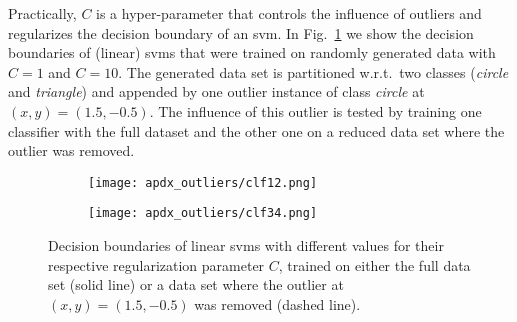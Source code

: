 Practically, $C$ is a hyper-parameter that controls the influence of outliers and regularizes the decision boundary of an \gls{svm}.
In Fig.~\ref{fig:apdx_svm} we show the decision boundaries of (linear) \glspl{svm} that were trained on randomly generated data with $C=1$ and $C=10$.
The generated data set is partitioned w.r.t.\ two classes (\textit{circle} and \textit{triangle}) and appended by one outlier instance of class \textit{circle} at $(x,y)=(1.5,-0.5)$.
The influence of this outlier is tested by training one classifier with the full dataset and the other one on a reduced data set where the outlier was removed.
\begin{figure}[htbp]
    \centering
    \begin{subfigure}{.49\textwidth}
        \centering
        \texttt{[image: apdx\_outliers/clf12.png]}
    \end{subfigure}
    \begin{subfigure}{.49\textwidth}
        \centering
        \texttt{[image: apdx\_outliers/clf34.png]}
    \end{subfigure}
    \caption{Decision boundaries of linear \glspl{svm} with different values for their respective regularization parameter $C$, trained on either the full data set (solid line) or a data set where the outlier at $(x,y)=(1.5,-0.5)$ was removed (dashed line).}
    \label{fig:apdx_svm}
\end{figure}

